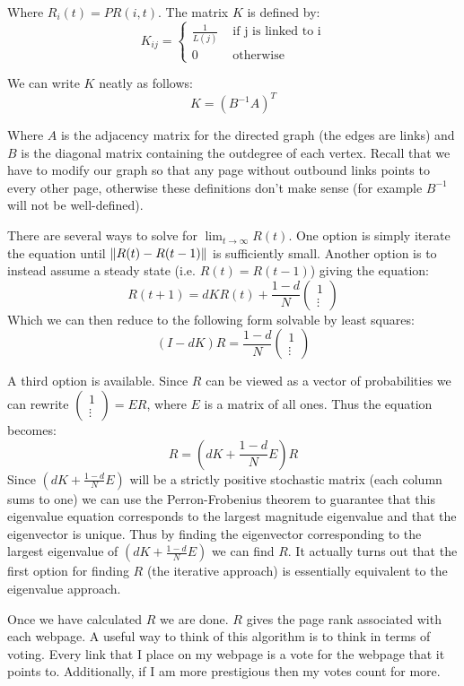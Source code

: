 Where $R_i(t) = PR(i,t)$. The matrix $K$ is defined by:
\[K_{ij} = \begin{cases} \frac{1}{L(j)} & \mbox{ if j is linked to i} \\ 0 & \mbox{ otherwise} \end{cases}\]

We can write $K$ neatly as follows:
\[K = (B^{-1}A)^T\]

Where $A$ is the adjacency matrix for the directed graph (the edges are links) and $B$ is the diagonal matrix containing the outdegree of each vertex.
Recall that we have to modify our graph so that any page without outbound links points to every other page, otherwise these definitions don't make sense (for example $B^{-1}$ will not be well-defined).

There are several ways to solve for $\lim_{t \to \infty} R(t)$.
One option is simply iterate the equation until $\left\lVert R(t)-R(t-1)\right\rVert$ is sufficiently small.
Another option is to instead assume a steady state (i.e. $R(t) = R(t-1)$) giving the equation:
\[R(t+1) = d K R(t) + \frac{1-d}{N} \begin{pmatrix}1\\\vdots\end{pmatrix}\]
Which we can then reduce to the following form solvable by least squares:
\[(I-dK)R = \frac{1-d}{N} \begin{pmatrix}1\\\vdots\end{pmatrix}\]

A third option is available.
Since $R$ can be viewed as a vector of probabilities we can rewrite $\left(\begin{smallmatrix}1\\\vdots\end{smallmatrix}\right) = E R$, where $E$ is a matrix of all ones.
Thus the equation becomes:
\[R = (dK + \frac{1-d}{N}E)R\]
Since $(dK + \frac{1-d}{N}E)$ will be a strictly positive stochastic matrix (each column sums to one) we can use the Perron-Frobenius theorem to guarantee that this eigenvalue equation corresponds to the largest magnitude eigenvalue and that the eigenvector is unique.
Thus by finding the eigenvector corresponding to the largest eigenvalue of $(dK + \frac{1-d}{N}E)$ we can find $R$.
It actually turns out that the first option for finding $R$ (the iterative approach) is essentially equivalent to the eigenvalue approach.

Once we have calculated $R$ we are done.
$R$ gives the page rank associated with each webpage.
A useful way to think of this algorithm is to think in terms of voting.
Every link that I place on my webpage is a vote for the webpage that it points to.
Additionally, if I am more prestigious then my votes count for more.

